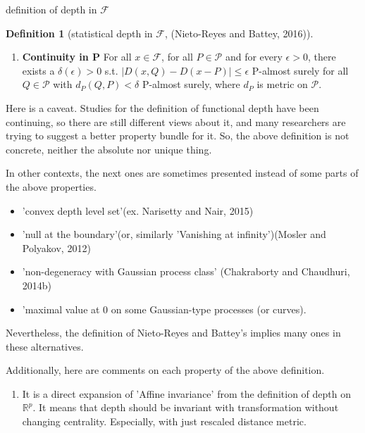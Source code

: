 \documentclass[aspectratio=169,ignorenonframetext,9pt]{beamer}
\theoremstyle{plain}
\theoremstyle{definition}
\newtheorem{defn}{Definition}[section]
\begin{document}
\begin{frame}{definition of depth in $\mathcal{F}$}
\begin{defn}[statistical depth in $\mathcal{F}$, (Nieto-Reyes and Battey, 2016)]
\begin{enumerate}
            Then, $D$ has a property that $D(x,P_X)<D(f(x),P_{f(X)})$ for any $x\in C(\mathcal{F},P)$
            with $D(x,P)<sup_{y\in\mathcal{F}}D(y,P)$ and $f:\mathcal{F}\rightarrow\mathcal{F}$
            s.t. $f(y(v))=\alpha(v)y(v)$ with $\alpha(v)\in(0,1)$ for all $v\in L_{\delta}$ and $\alpha(v)=1$  otherwise
            where \(L_\delta = argsup_{H\in V} \{sup_{x,y\in C(\mathcal{F},P)} d(x(H),y(H)) \leq \delta\}\)
            for any $\delta\in inf_{v\in V}d(L(v),U(v)), d(L,U)$ s.t. $\lambda(L_\delta)>0$ and $\lambda(L_\delta^c)>0$.
        \item \textbf{Continuity in P}
            For all $x\in\mathcal{F}$, for all $P \in \mathcal{P}$ and for every $\epsilon>0$,
            there exists a $\delta(\epsilon)>0$ s.t. $|D(x,Q)-D(x-P)|\leq\epsilon$ P-almost surely for all $Q\in\mathcal{P}$ with
            $d_P(Q,P)<\delta$ P-almost surely, where $d_P$ is metric on $\mathcal{P}$.
        \end{enumerate}
    \end{defn}

Here is a caveat. Studies for the definition of functional depth have been continuing, so
there are still different views about it, and many researchers are trying to
suggest a better property bundle for it. So, the above definition is not concrete, neither the absolute nor unique thing.
    
    
In other contexts, the next ones are sometimes presented instead of some parts of the above properties.
\begin{itemize}
    \item 'convex depth level set'(ex. Narisetty and Nair, 2015)
    \item 'null at the boundary'(or, similarly 'Vanishing at infinity')(Mosler and Polyakov, 2012)
    \item 'non-degeneracy with Gaussian process class' (Chakraborty and Chaudhuri, 2014b)
    \item 'maximal value at 0 on some Gaussian-type processes (or curves).
\end{itemize}
Nevertheless, the definition of Nieto-Reyes and Battey's implies many ones in these alternatives.

Additionally, here are comments on each property of the above definition.
\begin{enumerate}
    \item It is a direct expansion of 'Affine invariance' from the definition of depth on $\mathbb{R}^p$.
    It means that depth should be invariant with transformation without changing centrality.
    Especially, with just rescaled distance metric.
    

\end{enumerate}
\end{frame}
\end{document}
